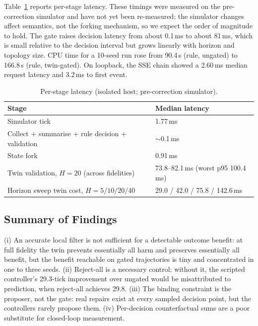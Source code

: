 \documentclass[conference]{IEEEtran}
\begin{document}
Table~\ref{tab:latency} reports per-stage latency. These timings were measured on the pre-correction simulator and have not yet been re-measured; the simulator changes affect semantics, not the forking mechanism, so we expect the order of magnitude to hold. The gate raises decision latency from about 0.1\,ms to about 81\,ms, which is small relative to the decision interval but grows linearly with horizon and topology size. CPU time for a 10-seed run rose from 90.4\,s (rule, ungated) to 166.8\,s (rule, twin-gated). On loopback, the SSE chain showed a 2.60\,ms median request latency and 3.2\,ms to first event.

\begin{table}[t]
\centering
\caption{Per-stage latency (isolated host; pre-correction simulator).}
\label{tab:latency}
\footnotesize
\begin{tabular}{@{}p{}p{}@{}}
\toprule
Stage & Median latency \\
\midrule
Simulator tick & 1.77\,ms \\
Collect + summarise + rule decision + validation & $\sim$0.1\,ms \\
State fork & 0.91\,ms \\
Twin validation, $H = 20$ (across fidelities) & 73.8--82.1\,ms (worst p95 100.4\,ms) \\
Horizon sweep twin cost, $H = 5 / 10 / 20 / 40$ & 29.0 / 42.0 / 75.8 / 142.6\,ms \\
\bottomrule
\end{tabular}
\end{table}

\subsection{Summary of Findings}

(i) An accurate local filter is not sufficient for a detectable outcome benefit: at full fidelity the twin prevents essentially all harm and preserves essentially all benefit, but the benefit reachable on gated trajectories is tiny and concentrated in one to three seeds. (ii) Reject-all is a necessary control: without it, the scripted controller's 29.3-tick improvement over ungated would be misattributed to prediction, when reject-all achieves 29.8. (iii) The binding constraint is the proposer, not the gate: real repairs exist at every sampled decision point, but the controllers rarely propose them. (iv) Per-decision counterfactual sums are a poor substitute for closed-loop measurement.
\end{document}

